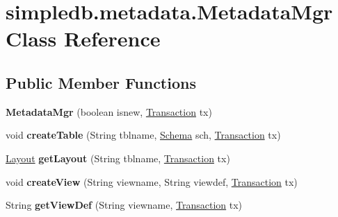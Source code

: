 \hypertarget{classsimpledb_1_1metadata_1_1MetadataMgr}{}\section{simpledb.\+metadata.\+Metadata\+Mgr Class Reference}
\label{classsimpledb_1_1metadata_1_1MetadataMgr}
\subsection*{Public Member Functions}
\begin{DoxyCompactItemize}
\item 
\mbox{\label{classsimpledb_1_1metadata_1_1MetadataMgr_a0c82fb3183a184ba3c23033017cbdb8e}} 
{\bfseries Metadata\+Mgr} (boolean isnew, \hyperlink{classsimpledb_1_1tx_1_1Transaction}{Transaction} tx)
\item 
\mbox{\label{classsimpledb_1_1metadata_1_1MetadataMgr_a577aa1ae2e4f823bd9022be26f8db9d4}} 
void {\bfseries create\+Table} (String tblname, \hyperlink{classsimpledb_1_1record_1_1Schema}{Schema} sch, \hyperlink{classsimpledb_1_1tx_1_1Transaction}{Transaction} tx)
\item 
\mbox{\label{classsimpledb_1_1metadata_1_1MetadataMgr_af53ec78039077e8f586e71fbec33aaa8}} 
\hyperlink{classsimpledb_1_1record_1_1Layout}{Layout} {\bfseries get\+Layout} (String tblname, \hyperlink{classsimpledb_1_1tx_1_1Transaction}{Transaction} tx)
\item 
\mbox{\label{classsimpledb_1_1metadata_1_1MetadataMgr_a21b61baf2262ef9dc2d04e6d698935af}} 
void {\bfseries create\+View} (String viewname, String viewdef, \hyperlink{classsimpledb_1_1tx_1_1Transaction}{Transaction} tx)
\item 
\mbox{\label{classsimpledb_1_1metadata_1_1MetadataMgr_a11cdbca19f654c231481fbfd80070f9c}} 
String {\bfseries get\+View\+Def} (String viewname, \hyperlink{classsimpledb_1_1tx_1_1Transaction}{Transaction} tx)
\item 
\mbox{\label{classsimpledb_1_1metadata_1_1MetadataMgr_ae9ff66ffe36f40c3fedb4615b0bffd87}} 

\end{DoxyCompactItemize}
